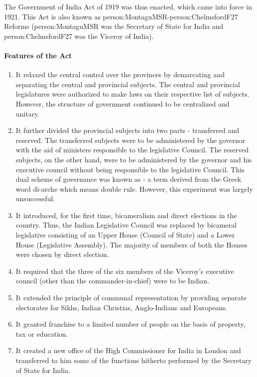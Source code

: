 The Government of India Act of 1919 was thus enacted, which came into force in 1921. This Act is also known as \gls{person:MontaguMSR}-\gls{person:ChelmsfordF27} Reforms (\gls{person:MontaguMSR} was the Secretary of State for India and \gls{person:ChelmsfordF27} was the Viceroy of India).

\paragraph{Features of the Act}
\begin{enumerate}
  \item It relaxed the central control over the provinces by demarcating and separating the central and provincial subjects. The central and provincial legislatures were authorized to make laws on their respective list of subjects. However, the structure of government continued to be
  centralized and unitary.
  \item It further divided the provincial subjects into two parts - transferred and reserved. The transferred subjects were to be administered by the governor with the aid of ministers responsible to the legislative Council. The reserved subjects, on the other hand, were to be administered by the governor and his executive council without being responsible to the legislative Council. This dual scheme of governance was known as
    - a term derived from the Greek word di-arche which means double rule. However, this experiment was largely unsuccessful.
  \item It introduced, for the first time, bicameralism and direct elections in the country. Thus, the Indian Legislative Council was replaced by bicameral legislative consisting of an Upper House (Council of State) and a Lower House (Legislative Assembly). The majority of members of both the Houses were chosen by direct election.
  \item It required that the three of the six members of the Viceroy's executive council (other than the commander-in-chief) were to be Indian.
  \item It extended the principle of communal representation by providing separate electorates for Sikhs, Indian Christias, Anglo-Indians and Europeans.
  \item It granted franchise to a limited number of people on the basis of property, tax or education.
  \item It created a new office of the High Commissioner for India in London and transferred to him some of the functions hitherto performed by the Secretary of State for India.

\end{enumerate}

